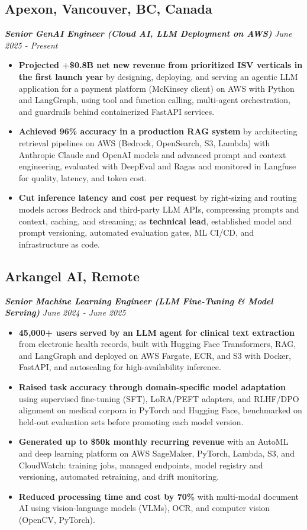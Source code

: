 \documentclass[9pt,a4paper]{extarticle}
\begin{document}
\subsection*{Apexon, Vancouver, BC, Canada}
{\fontsize{10}{11} \textbf{\textit{Senior GenAI Engineer (Cloud AI, LLM Deployment on AWS)}}} \hfill \textit{June 2025 - Present}
\begin{itemize}[noitemsep]
    \item \textbf{Projected +\$0.8B net new revenue from prioritized ISV verticals in the first launch year} by designing, deploying, and serving an agentic LLM application for a payment platform (McKinsey client) on AWS with Python and LangGraph, using tool and function calling, multi-agent orchestration, and guardrails behind containerized FastAPI services.
    \item \textbf{Achieved 96\% accuracy in a production RAG system} by architecting retrieval pipelines on AWS (Bedrock, OpenSearch, S3, Lambda) with Anthropic Claude and OpenAI models and advanced prompt and context engineering, evaluated with DeepEval and Ragas and monitored in Langfuse for quality, latency, and token cost.
    \item \textbf{Cut inference latency and cost per request} by right-sizing and routing models across Bedrock and third-party LLM APIs, compressing prompts and context, caching, and streaming; as \textbf{technical lead}, established model and prompt versioning, automated evaluation gates, ML CI/CD, and infrastructure as code.
\end{itemize}

\subsection*{Arkangel AI, Remote}
{\fontsize{10}{11} \textbf{\textit{Senior Machine Learning Engineer (LLM Fine-Tuning \& Model Serving)}}} \hfill \textit{June 2024 - June 2025}
\begin{itemize}[noitemsep]
    \item \textbf{45,000+ users served by an LLM agent for clinical text extraction} from electronic health records, built with Hugging Face Transformers, RAG, and LangGraph and deployed on AWS Fargate, ECR, and S3 with Docker, FastAPI, and autoscaling for high-availability inference.
    \item \textbf{Raised task accuracy through domain-specific model adaptation} using supervised fine-tuning (SFT), LoRA/PEFT adapters, and RLHF/DPO alignment on medical corpora in PyTorch and Hugging Face, benchmarked on held-out evaluation sets before promoting each model version.
    \item \textbf{Generated up to \$50k monthly recurring revenue} with an AutoML and deep learning platform on AWS SageMaker, PyTorch, Lambda, S3, and CloudWatch: training jobs, managed endpoints, model registry and versioning, automated retraining, and drift monitoring.
    \item \textbf{Reduced processing time and cost by 70\%} with multi-modal document AI using vision-language models (VLMs), OCR, and computer vision (OpenCV, PyTorch).
\end{itemize}
\end{document}
